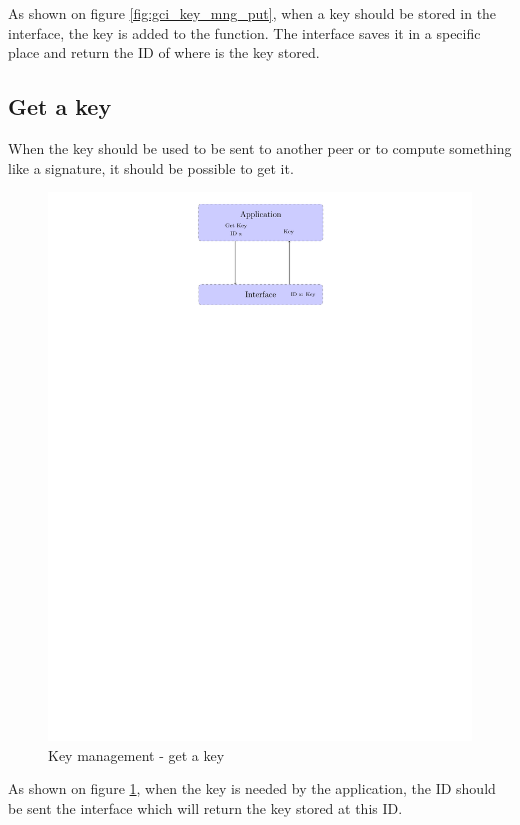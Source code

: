 As shown on figure \ref{fig:gci_key_mng_put}, when a key should be stored in the
interface, the key is added to the function. The interface saves it in a
specific place and return the ID of where is the key stored.


\subsection*{Get a key}
When the key should be used to be sent to another peer or to compute
something like a signature, it should be possible to get it.

\begin{figure}[!ht]
\centering
\includegraphics[trim=12cm 22cm 9.5cm 0cm]{figures/key_manag_get_key.pdf}
\caption{Key management - get a key\newline}
\label{fig:gci_key_mng_get}
\end{figure}

As shown on figure \ref{fig:gci_key_mng_get}, when the key is needed by the
application, the ID should be sent the interface which will return the key
stored at this ID.

